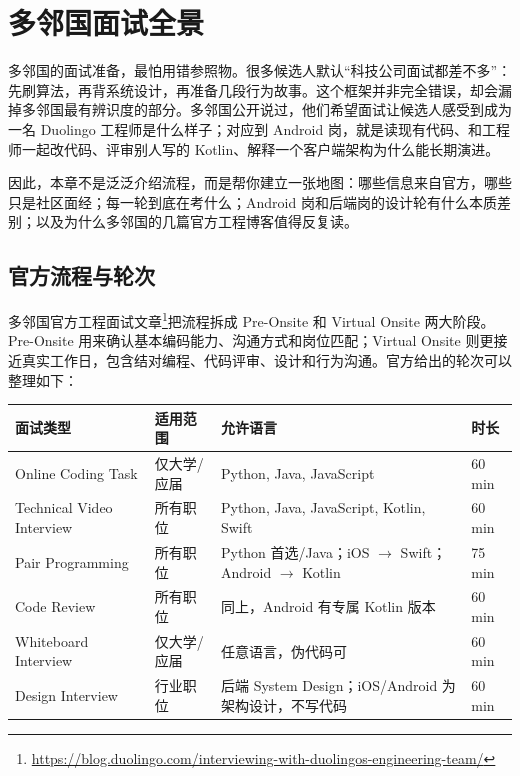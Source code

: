 \chapter{多邻国面试全景}

多邻国的面试准备，最怕用错参照物。很多候选人默认“科技公司面试都差不多”：先刷算法，再背系统设计，再准备几段行为故事。这个框架并非完全错误，却会漏掉多邻国最有辨识度的部分。多邻国公开说过，他们希望面试让候选人感受到成为一名 Duolingo 工程师是什么样子；对应到 Android 岗，就是读现有代码、和工程师一起改代码、评审别人写的 Kotlin、解释一个客户端架构为什么能长期演进。

因此，本章不是泛泛介绍流程，而是帮你建立一张地图：哪些信息来自官方，哪些只是社区面经；每一轮到底在考什么；Android 岗和后端岗的设计轮有什么本质差别；以及为什么多邻国的几篇官方工程博客值得反复读。

\section{官方流程与轮次}

\srcofficial 多邻国官方工程面试文章\footnote{\url{https://blog.duolingo.com/interviewing-with-duolingos-engineering-team/}}把流程拆成 Pre-Onsite 和 Virtual Onsite 两大阶段。Pre-Onsite 用来确认基本编码能力、沟通方式和岗位匹配；Virtual Onsite 则更接近真实工作日，包含结对编程、代码评审、设计和行为沟通。官方给出的轮次可以整理如下：

\begin{center}
\begin{tabularx}{\linewidth}{@{}l X X l@{}}
\toprule
\textbf{面试类型} & \textbf{适用范围} & \textbf{允许语言} & \textbf{时长} \\
\midrule
Online Coding Task & 仅大学/应届 & Python, Java, JavaScript & 60 min \\
Technical Video Interview & 所有职位 & Python, Java, JavaScript, Kotlin, Swift & 60 min \\
Pair Programming & 所有职位 & Python 首选/Java；iOS $\to$ Swift；Android $\to$ Kotlin & 75 min \\
Code Review & 所有职位 & 同上，Android 有专属 Kotlin 版本 & 60 min \\
Whiteboard Interview & 仅大学/应届 & 任意语言，伪代码可 & 60 min \\
Design Interview & 行业职位 & 后端 System Design；iOS/Android 为架构设计，不写代码 & 60 min \\
\bottomrule
\end{tabularx}
\end{center}

